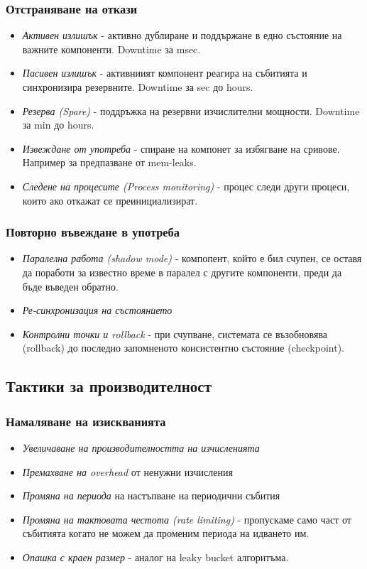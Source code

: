 \documentclass[fleqn,12pt]{article}
\begin{document}
\subsubsection{Отстраняване на откази}
\begin{itemize}
\item \textit{Активен излишък} - активно дублиране и поддържане в едно състояние на важните компоненти. Downtime за msec.
\item \textit{Пасивен излишък} - активниият компонент реагира на събитията и синхронизира резервните. Downtime за sec до hours.
\item \textit{Резерва (Spare)} - поддръжка на резервни изчислителни мощности. Downtime за min до hours.
\item \textit{Извеждане от употреба} - спиране на компонет за избягване на сривове. Например за предпазване от mem-leaks.
\item \textit{Следене на процесите (Process monitoring)} - процес следи други процеси, които ако откажат се преинициализират.
\end{itemize}
\subsubsection{Повторно въвеждане в употреба}
\begin{itemize}
\item \textit{Паралелна работа (shadow mode)} - компопент, който е бил счупен, се оставя да поработи за известно време в паралел с другите компоненти, преди да бъде въведен обратно.
\item \textit{Ре-синхронизация на състоянието}
\item \textit{Контролни точки и rollback} - при счупване, системата се възобновява (rollback) до последно запомненото консистентно състояние (checkpoint).
\end{itemize}

\subsection{Тактики за производителност}

\subsubsection{Намаляване на изискванията}
\begin{itemize}
\item \textit{Увеличаване на производителността на изчисленията}
\item \textit{Премахване на overhead} от ненужни изчисления
\item \textit{Промяна на периода} на настъпване на периодични събития
\item \textit{Промяна на тактовата честота (rate limiting)} - пропускаме само част от събитията когато не можем да променим периода на идването им. 
\item \textit{Опашка с краен размер} - аналог на leaky bucket алгоритъма.
\end{itemize}
\end{document}
